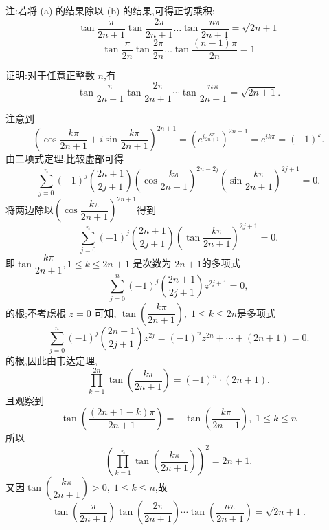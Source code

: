 \begin{questions}
\begin{solution}
    注:若将 (a) 的结果除以 (b) 的结果,可得正切乘积:
    \[ \tan \frac{\pi}{2n + 1} \tan \frac{2\pi}{2n + 1} \dots \tan \frac{n\pi}{2n + 1} = \sqrt{2n + 1} \]
    \[ \tan \frac{\pi}{2n} \tan \frac{2\pi}{2n} \dots \tan \frac{(n - 1)\pi}{2n} = 1 \]
\end{solution}
    \question 证明:对于任意正整数 $n$,有
        \[
        \tan \frac{\pi}{2n+1} \tan \frac{2\pi}{2n+1} \cdots \tan \frac{n\pi}{2n+1} = \sqrt{2n+1}.
        \]
    \begin{solution}
        注意到
        \[
        \left( \cos \frac{k\pi}{2n+1} + i \sin \frac{k\pi}{2n+1} \right)^{2n+1} = \left( e^{i \frac{k\pi}{2n+1}} \right)^{2n+1} = e^{ik\pi} = (-1)^k.
        \]
        由二项式定理,比较虚部可得
        \[
        \sum_{j=0}^n (-1)^j \binom{2n+1}{2j+1} \left( \cos \frac{k\pi}{2n+1} \right)^{2n-2j} \left( \sin \frac{k\pi}{2n+1} \right)^{2j+1} = 0.
        \]
        将两边除以$\left( \cos \dfrac{k\pi}{2n+1} \right)^{2n+1}$得到
        \[
        \sum_{j=0}^n (-1)^j \binom{2n+1}{2j+1} \left( \tan \frac{k\pi}{2n+1} \right)^{2j+1} = 0.
        \]
        即\(\tan \dfrac{k\pi}{2n+1},1 \leq k \leq 2n+1\) 是次数为 \(2n+1\)的多项式
        \[
        \sum_{j=0}^n (-1)^j \binom{2n+1}{2j+1} z^{2j+1} = 0,
        \]
        的根;不考虑根 \(z = 0\) 可知, $\tan\left(\dfrac{k\pi}{2n+1}\right),\; 1 \leq k \leq 2n$是多项式
        \[
        \sum_{j=0}^n (-1)^j \binom{2n+1}{2j+1} z^{2j} = (-1)^n z^{2n} + \cdots + (2n+1) = 0.
        \]
        的根,因此由韦达定理,
        \[
        \prod_{k=1}^{2n} \tan\left(\frac{k\pi}{2n+1}\right) = (-1)^n \cdot (2n+1).
        \]
        且观察到
        \[
        \tan\left(\frac{(2n+1-k)\pi}{2n+1}\right) = -\tan\left(\frac{k\pi}{2n+1}\right),\;1 \leq k \leq n
        \]
        所以
        \[
        \left( \prod_{k=1}^n \tan\left(\frac{k\pi}{2n+1}\right) \right)^2 = 2n+1.
        \]
        又因\(\tan\left(\dfrac{k\pi}{2n+1}\right) > 0,\;1 \leq k \leq n\),故
        \[
        \tan\left(\frac{\pi}{2n+1}\right) \tan\left(\frac{2\pi}{2n+1}\right) \cdots \tan\left(\frac{n\pi}{2n+1}\right) = \sqrt{2n+1}.
        \]
    \end{solution}


\end{questions}
